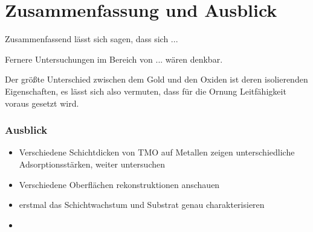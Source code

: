 \chapter{Zusammenfassung und Ausblick}
    Zusammenfassend lässt sich sagen, dass sich  ...

    Fernere Untersuchungen im Bereich von ... wären denkbar.

    Der größte Unterschied zwischen dem Gold und den Oxiden ist deren isolierenden Eigenschaften, es lässt sich also vermuten, dass für die Ornung Leitfähigkeit voraus gesetzt wird.


    \subsection{Ausblick}
    \begin{itemize}
        \item Verschiedene Schichtdicken von TMO auf Metallen zeigen unterschiedliche Adsorptionsstärken, weiter untersuchen \cite{IF_8}
        \item Verschiedene Oberflächen rekonstruktionen anschauen
        \item erstmal das Schichtwachstum und Substrat genau charakterisieren
        \item 
    \end{itemize}